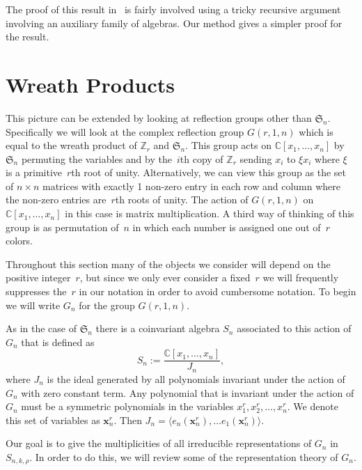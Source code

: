\documentclass[10pt]{article}
\newcommand{\coloneqq}{:=}
\begin{document}
The proof of this result in~\cite{HRS} is fairly involved using a tricky recursive argument involving an auxiliary family of 
algebras. Our method gives a simpler proof for the result.



\section{Wreath Products}
\label{Wreath}

This picture can be extended by looking at reflection groups other than $\mathfrak{S}_n$. Specifically we will look at the 
complex reflection group $G(r,1,n)$ which is equal to the wreath product of $\mathbb{Z}_r$ and $\mathfrak{S}_n$. This group 
acts on $\mathbb{C}[x_1,\ldots, x_n]$ by $\mathfrak{S}_n$ permuting the variables and by the~$i$th copy of $\mathbb{Z}_r$ 
sending $x_i$ to $\xi x_i$ where $\xi$ is a primitive~$r$th root of unity. Alternatively, we can view this group as the set 
of $n\times n$ matrices with exactly 1 non-zero entry in each row and column where the non-zero entries are~$r$th roots of 
unity. The action of $G(r,1,n)$ on $\mathbb{C}[x_1,\ldots, x_n]$ in this case is matrix multiplication. A third way of 
thinking of this group is as permutation of~$n$ in which each number is assigned one out of~$r$ colors. 

Throughout this section many of the objects we consider will depend on the positive integer~$r$, but since we only ever 
consider a fixed~$r$ we will frequently suppresses the~$r$ in our notation in order to avoid cumbersome notation. To begin 
we will write $G_n$ for the group $G(r,1,n)$.

As in the case of $\mathfrak{S}_n$ there is a coinvariant algebra $S_n$ associated to this action of $G_n$ that is defined 
as
\begin{equation}
S_n\coloneqq \frac{\mathbb{C}[x_1,\ldots, x_n]}{J_n},
\end{equation}
where $J_n$ is the ideal generated by all 
polynomials invariant under the action of $G_n$ with zero constant term. Any polynomial that is invariant under the action of 
$G_n$ must be a symmetric polynomials in the variables $x_1^r,x_2^r,\ldots, x_n^r$. We denote this set of variables as 
$\mathbf{x}_n^r$. Then $J_n=\langle e_n(\mathbf{x}_n^r),\ldots e_1(\mathbf{x}_n^r)\rangle$.

Our goal is to give the multiplicities of all irreducible representations of $G_n$ in $S_{n,k,\rho}$. In order to do this, we 
will review some of the representation theory of $G_n$.
\end{document}

